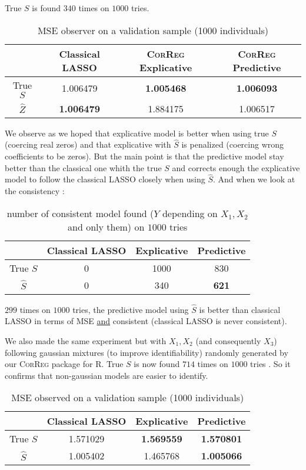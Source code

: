 \documentclass[11pt,a4paper]{report}
\begin{document}
		True $S$ is found $340$ times on $1000$ tries.
		
		\begin{table}[h!]
		\centering
		\begin{tabular}{|c|c|c|c|}
		\hline 
		 & Classical LASSO & \textsc{CorReg} Explicative & \textsc{CorReg} Predictive \\ 
		\hline 
		True $S$ &  1.006479 & \textbf{1.005468} & \textbf{1.006093} \\ 
		\hline 
		$\hat{Z}$ & \textbf{1.006479} & 1.884175 & 1.006517 \\ 
		\hline 
		\end{tabular} 
		\caption{MSE observer on a validation sample (1000 individuals)}
		\end{table}

		We observe as we hoped that explicative model is better when using true $S$ (coercing real zeros) and that explicative with $\hat{S}$ is penalized (coercing wrong coefficients to be zeros).
		But the main point is that the predictive model stay better than the classical one whith the true $S$ and corrects enough the explicative model to follow the classical LASSO closely when using $\hat{S}$. 
		And when we look at the consistency :
		\begin{table}[h!]	
		\centering
		\begin{tabular}{|c|c|c|c|}
		\hline 
		 & Classical LASSO & Explicative & Predictive \\ 
		\hline 
		True $S$ &  0 & 1000 & 830 \\ 
		\hline 
		$\hat{S}$ & 0 & 340 & \textbf{621} \\ 
		\hline 
		\end{tabular} 
		\caption{number of consistent model found ($Y$ depending on $X_1,X_2$ and only them) on $1000$ tries}
		\end{table}				
		
		$299$ times on $1000$ tries, the predictive model using $\hat{S}$ is better than classical LASSO in terms of MSE \underline{and} consistent (classical LASSO is never consistent).
		
		We also made the same experiment but with $X_1,X_2$ (and consequently $X_3$) following gaussian mixtures (to improve identifiability) randomly generated by our \textsc{CorReg} package for R. 
		True $S$ is now found $714$ times on $1000$ tries \label{testidentifiable}. So it confirms that non-gaussian models are easier to identify.
		
		
		\begin{table}[h!]
		\centering
		\begin{tabular}{|c|c|c|c|}
		\hline 
		 & Classical LASSO & Explicative & Predictive \\ 
		\hline 
		True $S$ &  1.571029 & \textbf{1.569559} & \textbf{1.570801} \\ 
		\hline 
		$\hat{S}$ & 1.005402 & 1.465768 & \textbf{1.005066} \\ 
		\hline 
		\end{tabular} 
		\caption{MSE observed on a validation sample (1000 individuals)}
		\end{table}
\end{document}
